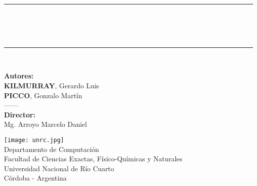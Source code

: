 \newcommand{\HRule}{\rule{\linewidth}{0.6mm}}
\begin{titlepage}

\begin{center}


\vspace*{1cm}
\HRule \\
  {\Huge\textbf{\maggen\\}}
\vspace*{0.5cm}
  {\large{\textbf{}}}
\\
 
\HRule \\[1cm]



\vspace*{1.2cm}

\Large{\textbf{Autores:}\\ \textbf{KILMURRAY}, Gerardo Luis\\ \textbf{PICCO}, Gonzalo Martín\\}
\vspace*{1cm}
{------\\}
\vspace*{1cm}
\textbf{Director:}\\ Mg. Arroyo Marcelo Daniel

\vspace*{1.5cm}
 \texttt{[image: unrc.jpg]}\\
\vspace*{1cm}
\large{Departamento de Computación\\
       Facultad de Ciencias Exactas, Físico-Químicas y Naturales\\
       Universidad Nacional de Río Cuarto\\
       Córdoba - Argentina}

\end{center}
\end{titlepage}
\sloppy

\titlepage
